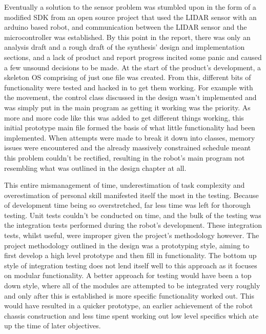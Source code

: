 		Eventually a solution to the sensor problem was stumbled upon in the form of a modified SDK from an open source project that used the LIDAR sensor with an arduino based robot, and communication between the LIDAR sensor and the microcontroller was established. By this point in the report, there was only an analysis draft and a rough draft of the synthesis' design and implementation sections, and a lack of product and report progress incited some panic and caused a few unsound decisions to be made. At the start of the product's development, a skeleton OS comprising of just one file was created. From this, different bits of functionality were tested and hacked in to get them working. For example with the movement, the control class discussed in the design wasn't implemented and was simply put in the main program as getting it working was the priority. As more and more code like this was added to get different things working, this initial prototype main file formed the basis of what little functionality had been implemented. When attempts were made to break it down into classes, memory issues were encountered and the already massively constrained schedule meant this problem couldn't be rectified, resulting in the robot's main program not resembling what was outlined in the design chapter at all.
		
		This entire mismanagement of time, underestimation of task complexity and overestimation of personal skill manifested itself the most in the testing. Because of development time being so overstretched, far less time was left for thorough testing. Unit tests couldn't be conducted on time, and the bulk of the testing was the integration tests performed during the robot's development. These integration tests, whilst useful, were improper given the project's methodology however. The project methodology outlined in the design was a prototyping style, aiming to first develop a high level prototype and then fill in functionality. The bottom up style of integration testing does not lend itself well to this approach as it focuses on modular functionality. A better approach for testing would have been a top down style, where all of the modules are attempted to be integrated very roughly and only after this is established is more specific functionality worked out. This would have resulted in a quicker prototype, an earlier achievement of the robot chassis construction and less time spent working out low level specifics which ate up the time of later objectives.
		
